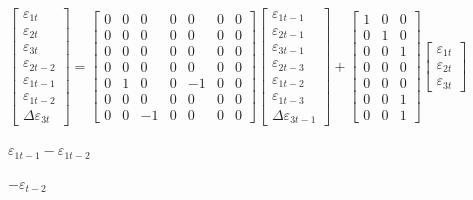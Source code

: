 \documentclass[a4paper,12pt]{article}
\begin{document}
\bigskip $%
\begin{bmatrix}
\varepsilon _{1t} \\
\varepsilon _{2t} \\
\varepsilon _{3t} \\
\varepsilon _{2t-2} \\
\varepsilon _{1t-1} \\
\varepsilon _{1t-2} \\
\Delta \varepsilon _{3t}%
\end{bmatrix}%
=%
\begin{bmatrix}
0 & 0 & 0 & 0 & 0 & 0 & 0 \\
0 & 0 & 0 & 0 & 0 & 0 & 0 \\
0 & 0 & 0 & 0 & 0 & 0 & 0 \\
0 & 0 & 0 & 0 & 0 & 0 & 0 \\
0 & 1 & 0 & 0 & -1 & 0 & 0 \\
0 & 0 & 0 & 0 & 0 & 0 & 0 \\
0 & 0 & -1 & 0 & 0 & 0 & 0%
\end{bmatrix}%
\begin{bmatrix}
\varepsilon _{1t-1} \\
\varepsilon _{2t-1} \\
\varepsilon _{3t-1} \\
\varepsilon _{2t-3} \\
\varepsilon _{1t-2} \\
\varepsilon _{1t-3} \\
\Delta \varepsilon _{3t-1}%
\end{bmatrix}%
+%
\begin{bmatrix}
1 & 0 & 0 \\
0 & 1 & 0 \\
0 & 0 & 1 \\
0 & 0 & 0 \\
0 & 0 & 0 \\
0 & 0 & 1 \\
0 & 0 & 1%
\end{bmatrix}%
\begin{bmatrix}
\varepsilon _{1t} \\
\varepsilon _{2t} \\
\varepsilon _{3t}%
\end{bmatrix}%
\allowbreak $

\bigskip

\bigskip $\varepsilon _{1t-1}-\varepsilon _{1t-2}$

\bigskip $-\varepsilon _{t-2}$

\bigskip \pagebreak
\end{document}
